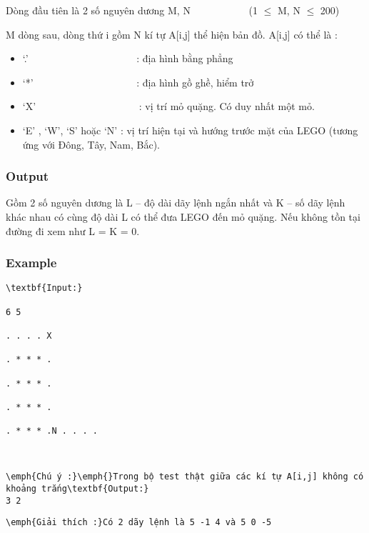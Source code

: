 \textbf{}   Dòng đầu tiên là 2 số nguyên dương M, N            (1  $\le$  M, N  $\le$  200)  

   M dòng sau, dòng thứ i gồm N kí tự A[i,j] thể hiện bản đồ. A[i,j] có thể là :  
\begin{itemize}
	\item     ‘.’                          : địa hình bằng phẳng   
	\item     ‘*’                         : địa hình gồ ghề, hiểm trở   
	\item     ‘X’                         : vị trí mỏ quặng. Có duy nhất một mỏ.   
	\item     ‘E’ , ‘W’, ‘S’ hoặc ‘N’ : vị trí hiện tại và hướng trước mặt của LEGO (tương ứng với Đông, Tây, Nam, Bắc).   
\end{itemize}

\subsubsection{   Output  }

\textbf{}   Gồm 2 số nguyên dương là L – độ dài dãy lệnh ngắn nhất và K – số dãy lệnh khác nhau có cùng độ dài L có thể đưa LEGO đến mỏ quặng. Nếu không tồn tại đường đi xem như L = K = 0.  

\subsubsection{   Example  }
\begin{verbatim}
\textbf{Input:}

6 5

. . . . X

. * * * .

. * * * .

. * * * .

. * * * .N . . . .\end{verbatim}
\begin{verbatim}


\emph{Chú ý :}\emph{}Trong bộ test thật giữa các kí tự A[i,j] không có khoảng trắng\textbf{Output:}
3 2\end{verbatim}
\begin{verbatim}
\emph{Giải thích :}Có 2 dãy lệnh là 5 -1 4 và 5 0 -5\end{verbatim}
